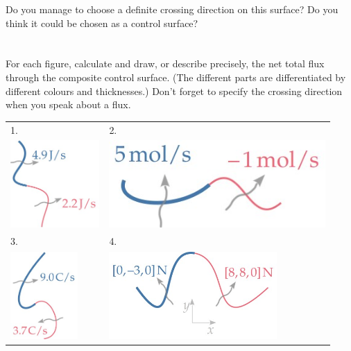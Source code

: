 \documentclass[a4paper,12pt,%
onecolumn,oneside,%
british%
]{memoir}
\renewcommand*{\|}[1][]{\nonscript\:#1\vert\nonscript\:\mathopen{}}
\begin{document}
Do you manage to choose a definite crossing direction on this surface? Do you think it could be chosen as a control surface?


\section{}
\label{sec:netflux}

For each figure, calculate and draw, or describe precisely, the net total flux through the composite control surface. (The different parts are differentiated by different colours and thicknesses.) Don't forget to specify the crossing direction when you speak about a flux.\noprelistbreak

\renewcommand{\tabularxcolumn}[1]{>{\bfseries}w{c}{0.45\linewidth}}
\begin{tabularx}{\linewidth}[h]{XX}
1.&2.
\\
  \includegraphics[align=c, height=9em,width=0.4\linewidth,keepaspectratio]{images/sumJ.jpg}
&  \includegraphics[align=c, height=9em,width=0.4\linewidth,keepaspectratio]{images/summol.jpg}
\\[15ex]
3.&4.
\\
 \includegraphics[align=c,
height=9em,width=0.4\linewidth,keepaspectratio]{images/sumC.jpg}
&  \includegraphics[align=c, height=9em,width=0.4\linewidth,keepaspectratio]{images/sumN1.jpg}

\end{tabularx}
\end{document}
